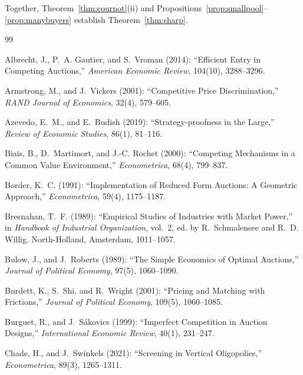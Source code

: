 \documentclass[12pt]{article}
\theoremstyle{mystyle}
\theoremstyle{mystyle2}
\newcommand{\1}{\mathbf{1}}
\begin{document}
Together, Theorem~\ref{thm:cournot}(ii) and Propositions~\ref{prop:smallpool}--\ref{prop:manybuyers} establish Theorem~\ref{thm:sharp}.

\begin{thebibliography}{99}

 Albrecht, J., P.~A. Gautier, and S.~Vroman (2014): ``Efficient Entry in Competing Auctions,'' \emph{American Economic Review}, 104(10), 3288--3296.

 Armstrong, M., and J.~Vickers (2001): ``Competitive Price Discrimination,'' \emph{RAND Journal of Economics}, 32(4), 579--605.

 Azevedo, E.~M., and E.~Budish (2019): ``Strategy-proofness in the Large,'' \emph{Review of Economic Studies}, 86(1), 81--116.

 Biais, B., D.~Martimort, and J.-C. Rochet (2000): ``Competing Mechanisms in a Common Value Environment,'' \emph{Econometrica}, 68(4), 799--837.

 Border, K.~C. (1991): ``Implementation of Reduced Form Auctions: A Geometric Approach,'' \emph{Econometrica}, 59(4), 1175--1187.

 Bresnahan, T.~F. (1989): ``Empirical Studies of Industries with Market Power,'' in \emph{Handbook of Industrial Organization}, vol.~2, ed. by R.~Schmalensee and R.~D. Willig. North-Holland, Amsterdam, 1011--1057.

 Bulow, J., and J.~Roberts (1989): ``The Simple Economics of Optimal Auctions,'' \emph{Journal of Political Economy}, 97(5), 1060--1090.

 Burdett, K., S.~Shi, and R.~Wright (2001): ``Pricing and Matching with Frictions,'' \emph{Journal of Political Economy}, 109(5), 1060--1085.

 Burguet, R., and J.~S{\'a}kovics (1999): ``Imperfect Competition in Auction Designs,'' \emph{International Economic Review}, 40(1), 231--247.

 Chade, H., and J.~Swinkels (2021): ``Screening in Vertical Oligopolies,'' \emph{Econometrica}, 89(3), 1265--1311.


\end{thebibliography}
\end{document}
